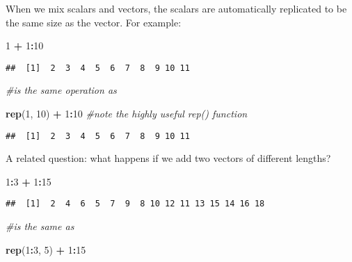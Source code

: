 \documentclass[11pt,]{article}
\newenvironment{Shaded}{\begin{snugshade}}{\end{snugshade}}
\newcommand{\KeywordTok}[1]{\textcolor[rgb]{0.13,0.29,0.53}{\textbf{#1}}}
\newcommand{\DecValTok}[1]{\textcolor[rgb]{0.00,0.00,0.81}{#1}}
\newcommand{\StringTok}[1]{\textcolor[rgb]{0.31,0.60,0.02}{#1}}
\newcommand{\CommentTok}[1]{\textcolor[rgb]{0.56,0.35,0.01}{\textit{#1}}}
\newcommand{\OperatorTok}[1]{\textcolor[rgb]{0.81,0.36,0.00}{\textbf{#1}}}
\newcommand{\NormalTok}[1]{#1}
\begin{document}
When we mix scalars and vectors, the scalars are automatically
replicated to be the same size as the vector. For example:

\begin{Shaded}
\begin{Highlighting}[]
\DecValTok{1} \OperatorTok{+}\StringTok{ }\DecValTok{1}\OperatorTok{:}\DecValTok{10}
\end{Highlighting}
\end{Shaded}

\begin{verbatim}
##  [1]  2  3  4  5  6  7  8  9 10 11
\end{verbatim}

\begin{Shaded}
\begin{Highlighting}[]
\CommentTok{#is the same operation as }

\KeywordTok{rep}\NormalTok{(}\DecValTok{1}\NormalTok{, }\DecValTok{10}\NormalTok{) }\OperatorTok{+}\StringTok{ }\DecValTok{1}\OperatorTok{:}\DecValTok{10} \CommentTok{#note the highly useful rep() function}
\end{Highlighting}
\end{Shaded}

\begin{verbatim}
##  [1]  2  3  4  5  6  7  8  9 10 11
\end{verbatim}

A related question: what happens if we add two vectors of different
lengths?

\begin{Shaded}
\begin{Highlighting}[]
\DecValTok{1}\OperatorTok{:}\DecValTok{3} \OperatorTok{+}\StringTok{ }\DecValTok{1}\OperatorTok{:}\DecValTok{15}
\end{Highlighting}
\end{Shaded}

\begin{verbatim}
##  [1]  2  4  6  5  7  9  8 10 12 11 13 15 14 16 18
\end{verbatim}

\begin{Shaded}
\begin{Highlighting}[]
\CommentTok{#is the same as}

\KeywordTok{rep}\NormalTok{(}\DecValTok{1}\OperatorTok{:}\DecValTok{3}\NormalTok{, }\DecValTok{5}\NormalTok{) }\OperatorTok{+}\StringTok{ }\DecValTok{1}\OperatorTok{:}\DecValTok{15}
\end{Highlighting}
\end{Shaded}
\end{document}
